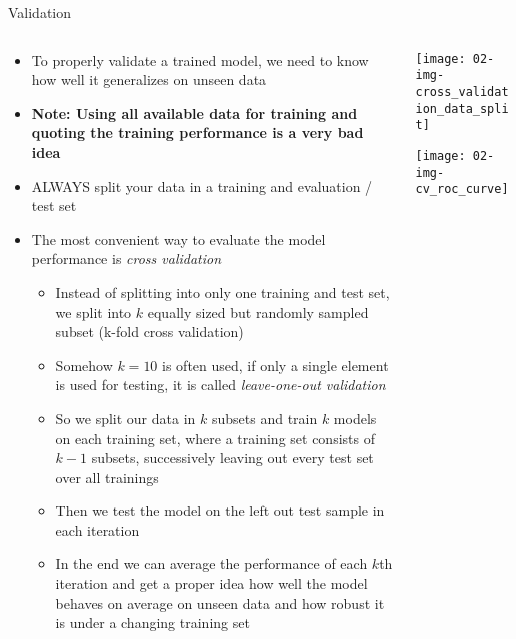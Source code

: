     \begin{frame}{Validation}
      \begin{columns}
        \begin{column}{0.7\textwidth}
          \begin{itemize}
            \item To properly validate a trained model, we need to know how well it generalizes on unseen data
            \item \textbf{Note: Using all available data for training and quoting the training performance is a very bad idea}
            \item ALWAYS split your data in a training and evaluation / test set
            \item The most convenient way to evaluate the model performance is \emph{cross validation}
            \begin{itemize}
              \item Instead of splitting into only one training and test set, we split into $k$ equally sized but randomly sampled subset (k-fold cross validation)
              \item Somehow $k=10$ is often used, if only a single element is used for testing, it is called \emph{leave-one-out validation}
              \item So we split our data in $k$ subsets and train $k$ models on each training set, where a training set consists of $k-1$ subsets, successively leaving out every test set over all trainings
              \item Then we test the model on the left out test sample in each iteration
              \item In the end we can average the performance of each $k$th iteration and get a proper idea how well the model behaves on average on unseen data and how robust it is under a changing training set
            \end{itemize}
          \end{itemize}
        \end{column}
        \begin{column}{0.3\textwidth}
          \texttt{[image: 02-img-cross\_validation\_data\_split]}

          \vspace{1cm}

          \texttt{[image: 02-img-cv\_roc\_curve]}
        \end{column}
      \end{columns}
    \end{frame}

